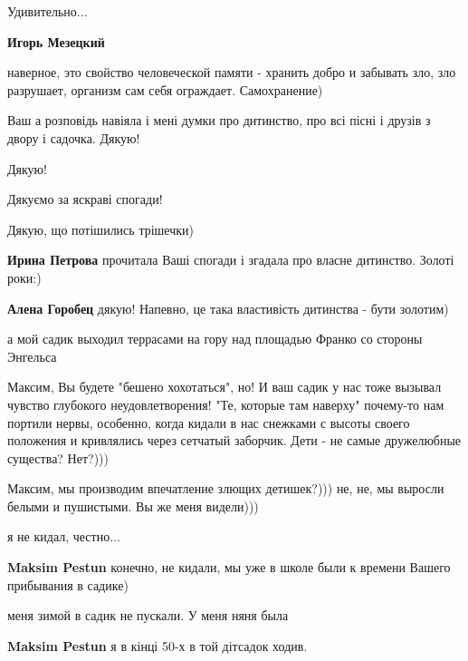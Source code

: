 \begin{itemize}
\begin{itemize}
Удивительно...

\textbf{Игорь Мезецкий} 

наверное, это свойство человеческой памяти - хранить добро и забывать зло, зло
разрушает, организм сам себя ограждает. Самохранение)

\end{itemize} %

Ваш а розповідь навіяла і мені думки про дитинство, про всі пісні і друзів з двору і садочка. Дякую!

Дякую!

Дякуємо за яскраві спогади!

\begin{itemize} %
Дякую, що потішились трішечки)

\textbf{Ирина Петрова} прочитала Ваші спогади і згадала про власне дитинство. Золоті роки:)

\textbf{Алена Горобец} дякую! Напевно, це така властивість дитинства - бути золотим)
\end{itemize} %


а мой садик выходил террасами на гору над площадью Франко со стороны Энгельса

\begin{itemize} %

Максим, Вы будете "бешено хохотаться", но! И ваш садик у нас тоже вызывал
чувство глубокого неудовлетворения! "Те, которые там наверху" почему-то нам
портили нервы, особенно, когда кидали в нас снежками с высоты своего положения
и кривлялись через сетчатый заборчик. Дети - не самые дружелюбные существа?
Нет?)))

\begin{itemize} %
Максим, мы производим впечатление злющих детишек?))) не, не, мы выросли белыми и пушистыми. Вы же меня видели)))
\end{itemize} %

я не кидал, честно...

\textbf{Maksim Pestun} конечно, не кидали, мы уже в школе были к времени Вашего прибывания в садике)

меня зимой в садик не пускали. У меня няня была

\textbf{Maksim Pestun} я в кінці 50-х в той дітсадок ходив.


\end{itemize}
\end{itemize}
